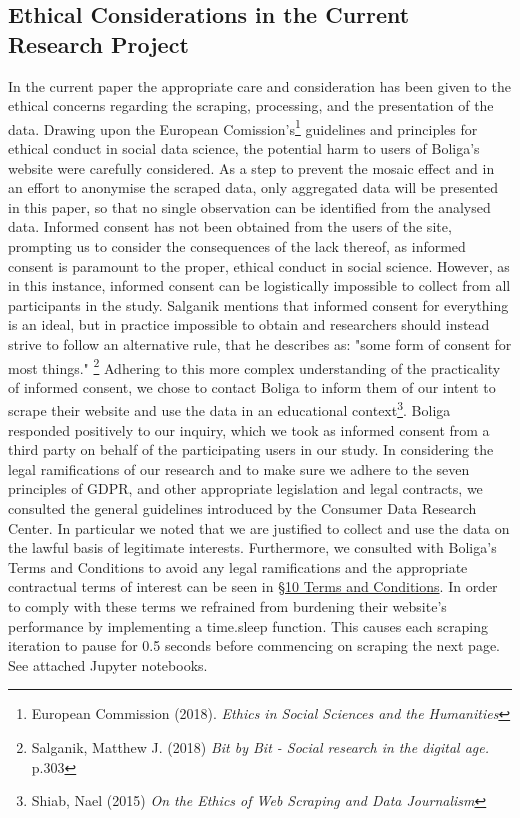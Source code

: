 \documentclass[12pt,a4paper]{article}
\begin{document}
\subsection{Ethical Considerations in the Current Research Project}
In the current paper the appropriate care and consideration has been given to the ethical concerns regarding the scraping, processing, and the presentation of the data. Drawing upon the European Comission's\footnote{European Commission (2018). \textit{Ethics in Social Sciences and the Humanities}} guidelines and principles for ethical conduct in social data science, the potential harm to users of Boliga's website were carefully considered. As a step to prevent the mosaic effect and in an effort to anonymise the scraped data, only aggregated data will be presented in this paper, so that no single observation can be identified from the analysed data.\newline
Informed consent has not been obtained from the users of the site, prompting us to consider the consequences of the lack thereof, as informed consent is paramount to the proper, ethical conduct in social science. However, as in this instance, informed consent can be logistically impossible to collect from all participants in the study. Salganik mentions that informed consent for everything is an ideal, but in practice impossible to obtain and researchers should instead strive to follow an alternative rule, that he describes as: "some form of consent for most things." \footnote{Salganik, Matthew J. (2018) \textit{Bit by Bit - Social research in the digital age.} p.303} Adhering to this more complex understanding of the practicality of informed consent, we chose to contact Boliga to inform them of our intent to scrape their website and use the data in an educational context\footnote{Shiab, Nael (2015) \textit{On the Ethics of Web Scraping and Data Journalism}}. Boliga responded positively to our inquiry, which we took as informed consent from a third party on behalf of the participating users in our study.\newline
In considering the legal ramifications of our research and to make sure we adhere to the seven principles of GDPR, and other appropriate legislation and legal contracts, we consulted the general guidelines introduced by the Consumer Data Research Center. In particular we noted that we are justified to collect and use the data on the lawful basis of legitimate interests. Furthermore, we consulted with Boliga's Terms and Conditions to avoid any legal ramifications and the appropriate contractual terms of interest can be seen in \href{https://www.boliga.dk/vilkaar-og-betingelser}{§10 Terms and Conditions}. In order to comply with these terms we refrained from burdening their website's performance by implementing a time.sleep function. This causes each scraping iteration to pause for 0.5 seconds before commencing on scraping the next page. See attached Jupyter notebooks. 
\end{document}
